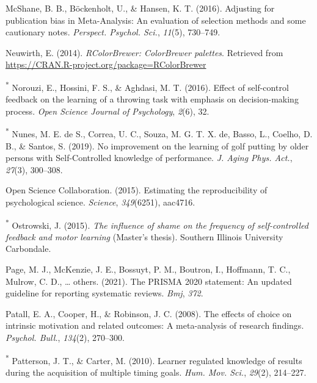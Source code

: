 \documentclass[
  english,
  man,floatsintext]{apa7}
\newlength{\cslhangindent}
\newlength{\cslentryspacingunit} %
\newenvironment{CSLReferences}[2] %
 {%
  \setlength{\parindent}{0pt}
  \ifodd #1
  \let\oldpar\par
  \def\par{\hangindent=\cslhangindent\oldpar}
  \fi
  \setlength{\parskip}{#2\cslentryspacingunit}
 }%
 {}
\begin{document}
\begin{CSLReferences}{1}{0}
\leavevmode{}%
McShane, B. B., Böckenholt, U., \& Hansen, K. T. (2016). Adjusting for publication bias in {Meta-Analysis}: An evaluation of selection methods and some cautionary notes. \emph{Perspect. Psychol. Sci.}, \emph{11}(5), 730--749.

\leavevmode{}%
Neuwirth, E. (2014). \emph{RColorBrewer: ColorBrewer palettes}. Retrieved from \url{https://CRAN.R-project.org/package=RColorBrewer}

\leavevmode{}%
\textsuperscript{*} Norouzi, E., Hossini, F. S., \& Aghdasi, M. T. (2016). Effect of self-control feedback on the learning of a throwing task with emphasis on decision-making process. \emph{Open Science Journal of Psychology}, \emph{2}(6), 32.

\leavevmode{}%
\textsuperscript{*} Nunes, M. E. de S., Correa, U. C., Souza, M. G. T. X. de, Basso, L., Coelho, D. B., \& Santos, S. (2019). No improvement on the learning of golf putting by older persons with {Self-Controlled} knowledge of performance. \emph{J. Aging Phys. Act.}, \emph{27}(3), 300--308.

\leavevmode{}%
Open Science Collaboration. (2015). Estimating the reproducibility of psychological science. \emph{Science}, \emph{349}(6251), aac4716.

\leavevmode{}%
\textsuperscript{*} Ostrowski, J. (2015). \emph{The influence of shame on the frequency of self-controlled feedback and motor learning} (Master's thesis). Southern Illinois University Carbondale.

\leavevmode{}%
Page, M. J., McKenzie, J. E., Bossuyt, P. M., Boutron, I., Hoffmann, T. C., Mulrow, C. D., \ldots{} others. (2021). The PRISMA 2020 statement: An updated guideline for reporting systematic reviews. \emph{Bmj}, \emph{372}.

\leavevmode{}%
Patall, E. A., Cooper, H., \& Robinson, J. C. (2008). The effects of choice on intrinsic motivation and related outcomes: A meta-analysis of research findings. \emph{Psychol. Bull.}, \emph{134}(2), 270--300.

\leavevmode{}%
\textsuperscript{*} Patterson, J. T., \& Carter, M. (2010). Learner regulated knowledge of results during the acquisition of multiple timing goals. \emph{Hum. Mov. Sci.}, \emph{29}(2), 214--227.


\end{CSLReferences}
\end{document}
